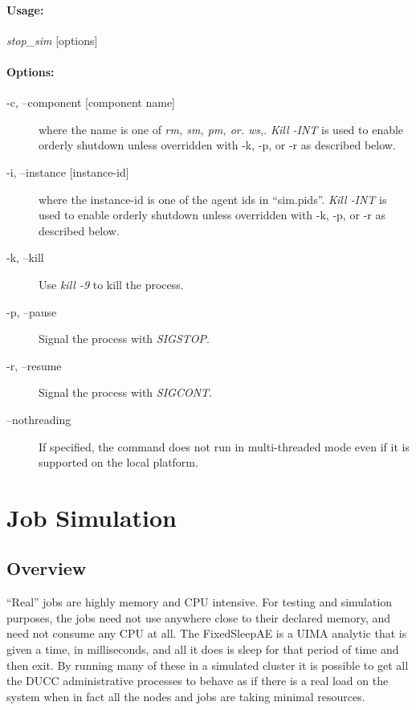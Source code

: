     \paragraph{Usage:}
    {\em stop\_sim} [options]

    \paragraph{Options:}
    \begin{description}
      \item[-c, --component {[component name]}] where the name is one of {\em
        rm, sm, pm, or. ws,}.  {\em Kill -INT} is used to enable orderly shutdown
      unless overridden with -k, -p, or -r as described below.
      \item[-i, --instance {[instance-id]}] where the instance-id is one of the
        agent ids in ``sim.pids''. {\em Kill -INT} is used to enable orderly shutdown
      unless overridden with -k, -p, or -r as described below.
      \item[-k, --kill] Use {\em kill -9} to kill the process.
      \item[-p, --pause] Signal the process with {\em SIGSTOP}.
      \item[-r, --resume] Signal the process with {\em SIGCONT}.
      \item[--nothreading] If specified, the command does not run in multi-threaded mode
        even if it is supported on the local platform.

    \end{description}
    
\section{Job Simulation}

    \subsection{Overview}
     ``Real'' jobs are highly memory and CPU intensive.  For testing and simulation
     purposes, the jobs need not use anywhere close to their declared memory, and
     need not consume any CPU at all.  The FixedSleepAE is a UIMA analytic that
     is given a time, in milliseconds, and all it does is sleep for that period
     of time and then exit.  By running many of these in a simulated cluster
     it is possible to get all the DUCC administrative processes to behave 
     as if there is a real load on the system when in fact all the nodes and
     jobs are taking minimal resources.

